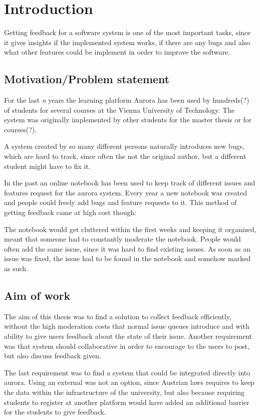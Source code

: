 \chapter{Introduction}

Getting feedback for a software system is one of the most important tasks, since it gives insights if the implemented system works, if there are any bugs and also what other features could be implement in order to improve the software.

\section{Motivation/Problem statement}

For the last \emph{n} years the learning platform Aurora has been used by hundreds(?) of students for several courses at the Vienna University of Technology. The system was originally implemented by other students for the master thesis or for courses(?).

A system created by so many different persons naturally introduces new bugs, which are hard to track, since often the not the original author, but a different student might have to fix it.

In the past an online notebook has been used to keep track of different issues and features request for the aurora system. Every year a new notebook was created and people could freely add bugs and feature requests to it. This method of getting feedback came at high cost though:

The notebook would get cluttered within the first weeks and keeping it organized, meant that someone had to constantly moderate the notebook.
People would often add the same issue, since it was hard to find existing issues.
As soon as an issue was fixed, the issue had to be found in the notebook and somehow marked as such. 


\section{Aim of work}

The aim of this thesis was to find a solution to collect feedback efficiently, without the high moderation costs that normal issue queues introduce and with ability to give users feedback about the state of their issue. Another requirement was that system should collaborative in order to encourage to the users to post, but also discuss feedback given.

The last requirement was to find a system that could be integrated directly into aurora. Using an external was not an option, since Austrian laws requires to keep the data within the infrastructure of the university, but also because requiring students to register at another platform would have added an additional barrier for the students to give feedback.